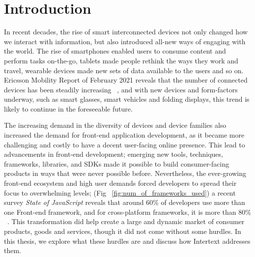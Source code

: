 
\chapter{Introduction}

In recent decades, the rise of smart interconnected devices not only changed how we interact with information, but also introduced all-new ways of engaging with the world. The rise of smartphones enabled users to consume content and perform tasks on-the-go, tablets made people rethink the ways they work and travel, wearable devices made new sets of data available to the users and so on. Ericsson Mobility Report of February 2021 reveals that the number of connected devices has been steadily increasing ~\cite{EricssonMobility2020}, and with new devices and form-factors underway, such as smart glasses, smart vehicles and folding displays, this trend is likely to continue in the foreseeable future. 

The increasing demand in the diversity of devices and device families also increased the demand for front-end application development, as it became more challenging and costly to have a decent user-facing online presence. This lead to advancements in front-end development; emerging new tools, techniques, frameworks, libraries, and SDKs made it possible to build consumer-facing products in ways that were never possible before. Nevertheless, the ever-growing front-end ecosystem and high user demands forced developers to spread their focus to overwhelming levels; (Fig ~\ref{fig:num_of_frameworks_used}) a recent survey \textit{State of JavaScript} reveals that around 60\% of developers use more than one Front-end framework, and for cross-platform frameworks, it is more than 80\% ~\cite{StateOfJs2020}. This transformation did help create a large and dynamic market of consumer products, goods and services, though it did not come without some hurdles. In this thesis, we explore what these hurdles are and discuss how Intertext addresses them.

